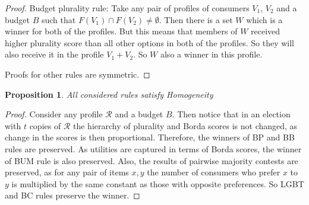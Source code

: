 \documentclass{article}
\newtheorem{mytheorem}{Proposition}
\begin{document}
\begin{proof}
Budget plurality rule:  Take any pair of profiles of consumers $V_1$, $V_2$ and a budget $B$ such that $F(V_1) \cap F(V_2) \neq \emptyset$. Then there is a set $W$ which is a winner for both of the profiles. But this means that members of $W$ received  higher plurality score than all other options in both of the profiles. So  they will also receive it in the profile $V_1 + V_2$. So $W$ also a winner in this profile.

Proofs for other rules are symmetric.
\end{proof}
\begin{mytheorem}
All considered rules satisfy Homogeneity
\end{mytheorem}
\begin{proof}

Consider any profile $\mathcal{R}$ and a budget $B$. Then notice that in an election with $t$ copies of $\mathcal{R}$ the hierarchy of plurality and Borda scores is not changed, as change in the scores is then proportional. Therefore, the winners of BP and BB rules are preserved. As utilities are captured in terms of Borda scores, the winner of BUM rule is also preserved. Also, the results of pairwise majority contests are preserved, as for any pair of items $x, y$  the number of consumers who prefer $x$ to $y$ is multiplied by the same constant as those with opposite preferences. So LGBT and BC rules preserve the winner.
\end{proof}
\end{document}
